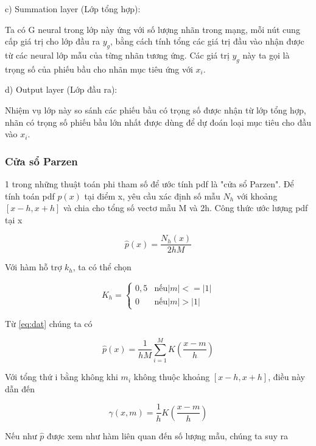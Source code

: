 \vspace{\baselineskip}
c)	Summation layer (Lớp tổng hợp): 

Ta có G neural trong lớp này ứng với số lượng nhãn trong mạng, mỗi nút cung cấp giá trị cho lớp đầu ra $y_g$,  bằng cách tính tổng các giá trị đầu vào nhận được từ các neural lớp mẫu của từng nhãn tương ứng. Các giá trị $y_g$ này ta gọi là trọng số của phiếu bầu cho nhãn mục tiêu ứng với $x_i$.

\vspace{\baselineskip}
d)	Output layer (Lớp đầu ra): 

Nhiệm vụ lớp này so sánh các phiếu bầu có trọng số được nhận từ lớp tổng hợp, nhãn có trọng số phiếu bầu lớn nhất được dùng để dự đoán loại mục tiêu cho đầu vào $x_i$.

\subsubsection{Cửa sổ Parzen}

1 trong những thuật toán phi tham số để ước tính \ac{pdf} là "cửa sổ Parzen". Để tính toán \ac{pdf} $p(x)$ tại điểm x, yêu cầu xác định số mẫu $N_h$ với khoảng $[x-h,x+h]$ và chia cho tổng số vectơ mẫu M và 2h. Công thức ước lượng \ac{pdf} tại x

\begin{equation}
	\hat{p}(x)=\dfrac{N_h(x)}{2hM}
	\label{eq:dat}
\end{equation}

Với hàm hỗ trợ $k_h$, ta có thể chọn


	$$
	K_h=
	\begin{cases}
		0,5 & \text{nếu} |m|<=|1|\\
	0 & \text{nếu} |m|>|1|
	\end{cases}
$$




Từ \eqref{eq:dat} chúng ta có

\begin{equation}
	\hat{p}(x)=\dfrac{1}{hM} \sum_{i=1}^{M} K(\dfrac{x-m}{h})
\end{equation}

Với tổng thứ i bằng không khi $m_i$ không thuộc khoảng $[x-h,x+h]$, điều này dẫn đến

\begin{equation}
	\gamma (x,m) = \dfrac{1}{h} K(\dfrac{x-m}{h})
\end{equation}

Nếu như $\hat{p}$ được xem như hàm liên quan đến số lượng mẫu, chúng ta suy ra

